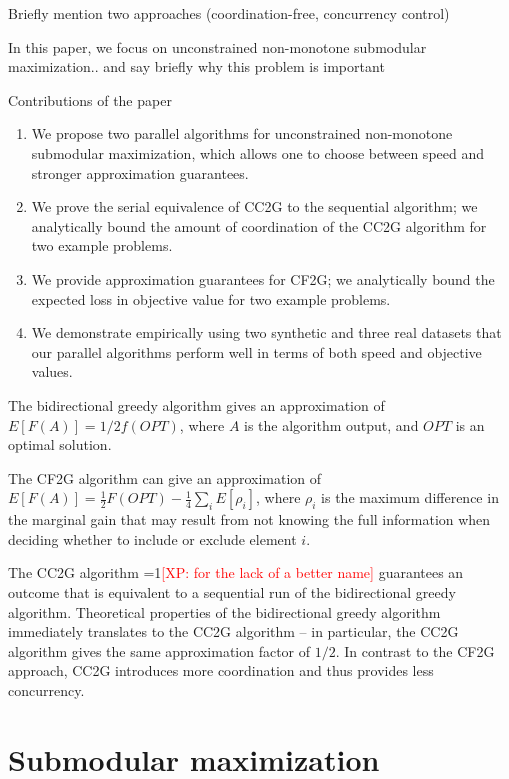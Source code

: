 \documentclass{article} %
\newcommand{\hogwild}{CF2G}
\newcommand{\occ}{CC2G}
\newcommand{\Comments}{1}
\newcommand{\note}[2]{\ifnum\Comments=1\textcolor{#1}{#2}\fi}
\newcommand{\xinghao}[1]{\note{red}{[XP: #1]}}
\begin{document}
Briefly mention two approaches (coordination-free, concurrency control)

In this paper, we focus on unconstrained non-monotone submodular maximization.. and say briefly why this problem is important

Contributions of the paper
\begin{enumerate}
\item We propose two parallel algorithms for unconstrained non-monotone submodular maximization, which allows one to choose between speed and stronger approximation guarantees.
\item We prove the serial equivalence of \occ{} to the sequential algorithm; we analytically bound the amount of coordination of the \occ{} algorithm for two example problems.
\item We provide approximation guarantees for \hogwild{}; we analytically bound the expected loss in objective value for two example problems.
\item We demonstrate empirically using two synthetic and three real datasets that our parallel algorithms perform well in terms of both speed and objective values.
\end{enumerate}



The bidirectional greedy algorithm \cite{buchbinder2012} gives an approximation of $E[F(A)] = 1/2 f(OPT)$, where $A$ is the algorithm output, and $OPT$ is an optimal solution.

The \hogwild{} algorithm can give an approximation of $E[F(A)] = \frac{1}{2} F(OPT) - \frac{1}{4}\sum_iE[\rho_i]$, where $\rho_i$ is the maximum difference in the marginal gain that may result from not knowing the full information when deciding whether to include or exclude element $i$.

The \occ{} algorithm \xinghao{for the lack of a better name} guarantees an outcome that is equivalent to a sequential run of the bidirectional greedy algorithm.
Theoretical properties of the bidirectional greedy algorithm immediately translates to the \occ{} algorithm -- in particular, the \occ{} algorithm gives the same approximation factor of $1/2$.
In contrast to the \hogwild{} approach, \occ{} introduces more coordination and thus provides less concurrency.











\section{Submodular maximization}
\end{document}
